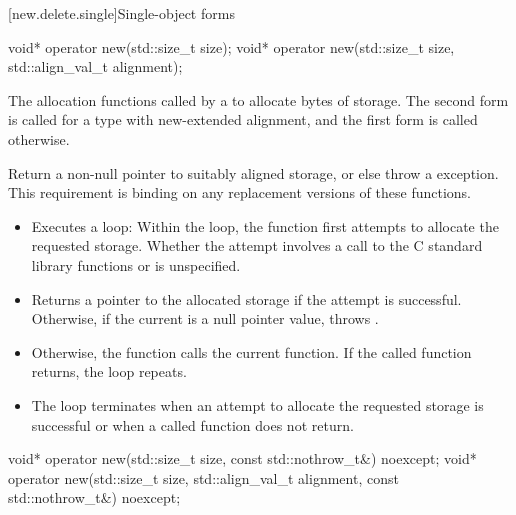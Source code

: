[new.delete.single]{Single-object forms}

%
\begin{itemdecl}
void* operator new(std::size_t size);
void* operator new(std::size_t size, std::align_val_t alignment);
\end{itemdecl}

\begin{itemdescr}
\pnum
\effects
The
allocation functions
called by a
to allocate
 bytes of storage.
The second form is called for a type with new-extended alignment, and
the first form is called otherwise.

\pnum
\replaceable
{}

\pnum
\required
Return a non-null pointer to suitably aligned storage,
or else throw a
%
exception.
This requirement is binding on any replacement versions of these functions.

\pnum
{}

\begin{itemize}
\item
Executes a loop:
Within the loop, the function first attempts to allocate the requested storage.
Whether the attempt involves a call to the C standard library functions
 or 
is unspecified.
%
\item
Returns a pointer to the allocated storage if the attempt is successful.
Otherwise, if the
current  is
a null pointer value, throws
.
\item
Otherwise, the function calls the current
 function.
If the called function returns, the loop repeats.
\item
The loop terminates when an attempt to allocate the requested storage is
successful or when a called
function does not return.
\end{itemize}
\end{itemdescr}

%
\begin{itemdecl}
void* operator new(std::size_t size, const std::nothrow_t&) noexcept;
void* operator new(std::size_t size, std::align_val_t alignment, const std::nothrow_t&) noexcept;
\end{itemdecl}

